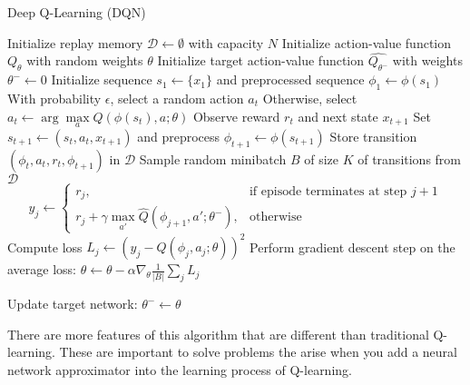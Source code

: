 \begin{algorithm}[H]
\caption{Deep Q-Learning (DQN)}
\begin{algorithmic}[1]
\State Initialize replay memory $\mathcal{D} \leftarrow \emptyset$ with capacity $N$
\State Initialize action-value function $Q_{\theta}$ with random weights $\theta$
\State Initialize target action-value function $\hat{Q_{\theta^{-}}}$ with weights $\theta^{-} \leftarrow 0$
    \State Initialize sequence $s_{1} \leftarrow \{ x_{1} \}$ and preprocessed sequence $\phi_{1} \leftarrow \phi(s_{1})$
        \State With probability $\epsilon$, select a random action $a_{t}$
        \State Otherwise, select $a_{t} \leftarrow \arg\max\limits_{a} Q(\phi(s_{t}), a; \theta)$
        \State Observe reward $r_{t}$ and next state $x_{t+1}$
        \State Set $s_{t+1} \leftarrow (s_{t}, a_{t}, x_{t+1})$ and preprocess $\phi_{t+1} \leftarrow \phi(s_{t+1})$
        \State Store transition $(\phi_{t}, a_{t}, r_{t}, \phi_{t+1})$ in $\mathcal{D}$
        \State Sample random minibatch $B$ of size $K$ of transitions from $\mathcal{D}$
            \[
            y_j \leftarrow \begin{cases} 
            r_j, & \text{if episode terminates at step } j+1 \\
            r_{j} + \gamma \max\limits_{a'} \hat{Q}(\phi_{j+1}, a'; \theta^{-}), & \text{otherwise}
            \end{cases}
            \]
            \State Compute loss $L_{j} \leftarrow (y_{j} - Q(\phi_{j}, a_{j}; \theta))^{2}$
        \EndFor
        \State Perform gradient descent step on the average loss: $\theta \leftarrow \theta - \alpha \nabla_{\theta} \frac{1}{|B|}\sum_{j} L_{j}$ 
        
            \State Update target network: $\theta^{-} \leftarrow \theta$
        \EndIf
    \EndFor
\EndFor
\end{algorithmic}
\end{algorithm}

There are more features of this algorithm that are different than traditional Q-learning. These are important to solve problems the arise when you add a neural network approximator into the learning process of Q-learning.


